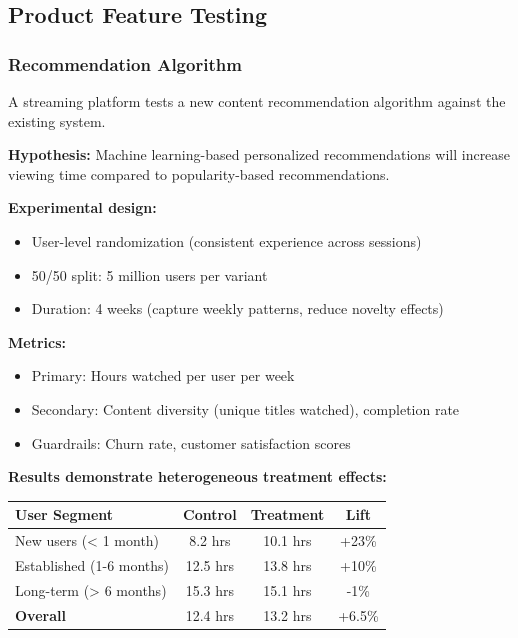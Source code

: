 \subsection{Product Feature Testing}

\subsubsection{Recommendation Algorithm}

A streaming platform tests a new content recommendation algorithm against the existing system.

\textbf{Hypothesis:} Machine learning-based personalized recommendations will increase viewing time compared to popularity-based recommendations.

\textbf{Experimental design:}
\begin{itemize}
    \item User-level randomization (consistent experience across sessions)
    \item 50/50 split: 5 million users per variant
    \item Duration: 4 weeks (capture weekly patterns, reduce novelty effects)
\end{itemize}

\textbf{Metrics:}
\begin{itemize}
    \item Primary: Hours watched per user per week
    \item Secondary: Content diversity (unique titles watched), completion rate
    \item Guardrails: Churn rate, customer satisfaction scores
\end{itemize}

\textbf{Results demonstrate heterogeneous treatment effects:}

\begin{center}
\begin{tabular}{lccc}
\toprule
\textbf{User Segment} & \textbf{Control} & \textbf{Treatment} & \textbf{Lift} \\
\midrule
New users (< 1 month) & 8.2 hrs & 10.1 hrs & +23\% \\
Established (1-6 months) & 12.5 hrs & 13.8 hrs & +10\% \\
Long-term (> 6 months) & 15.3 hrs & 15.1 hrs & -1\% \\
\midrule
\textbf{Overall} & 12.4 hrs & 13.2 hrs & +6.5\% \\
\bottomrule
\end{tabular}
\end{center}

